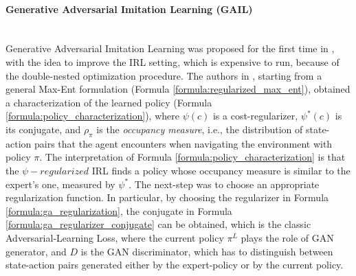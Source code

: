 \paragraph{Generative Adversarial Imitation Learning (GAIL)} \mbox{} \\
\label{para:gail}
Generative Adversarial Imitation Learning was proposed for the first time in \cite{ho2016gail}, with the idea to improve the IRL setting, which is expensive to run, because of the double-nested optimization procedure. The authors in \cite{ho2016gail}, starting from a general Max-Ent formulation (Formula \ref{formula:regularized_max_ent}), obtained a characterization of the learned policy (Formula \ref{formula:policy_characterization}), where $\psi(c)$ is a cost-regularizer, $\psi^{*}(c)$ is its conjugate, and $\rho_{\pi}$ is the \textit{occupancy measure}, i.e., the distribution of state-action pairs that the agent encounters when navigating the environment with policy $\pi$. The interpretation of Formula \ref{formula:policy_characterization} is that the $\psi-regularized$ IRL finds a policy whose occupancy measure is similar to the expert's one, measured by $\psi^{*}$. The next-step was to choose an appropriate regularization function. In particular, by choosing the regularizer in Formula \ref{formula:ga_regularization}, the conjugate in Formula \ref{formula:ga_regularizer_conjugate} can be obtained, which is the classic Adversarial-Learning Loss, where the current policy $\pi^{L}$ plays the role of GAN generator, and $D$ is the GAN discriminator, which has to distinguish between state-action pairs generated either by the expert-policy or by the current policy.
